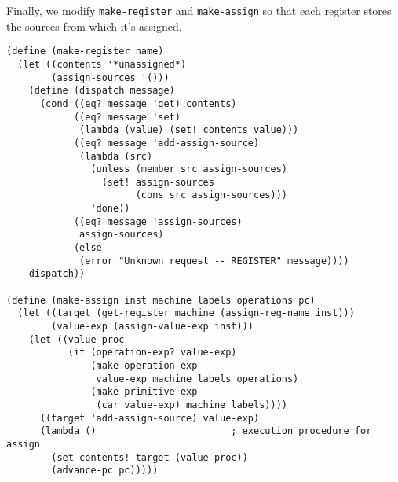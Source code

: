 \documentclass[a4paper,12pt]{article}
\begin{document}
Finally, we modify \lstinline!make-register! and
\lstinline!make-assign! so that each register stores the sources from
which it's assigned.

\begin{lstlisting}
(define (make-register name)
  (let ((contents '*unassigned*)
        (assign-sources '()))
    (define (dispatch message)
      (cond ((eq? message 'get) contents)
            ((eq? message 'set)
             (lambda (value) (set! contents value)))
            ((eq? message 'add-assign-source)
             (lambda (src)
               (unless (member src assign-sources)
                 (set! assign-sources
                       (cons src assign-sources)))
               'done))
            ((eq? message 'assign-sources)
             assign-sources)
            (else
             (error "Unknown request -- REGISTER" message))))
    dispatch))

(define (make-assign inst machine labels operations pc)
  (let ((target (get-register machine (assign-reg-name inst)))
        (value-exp (assign-value-exp inst)))
    (let ((value-proc
           (if (operation-exp? value-exp)
               (make-operation-exp
                value-exp machine labels operations)
               (make-primitive-exp
                (car value-exp) machine labels))))
      ((target 'add-assign-source) value-exp)
      (lambda ()                        ; execution procedure for assign
        (set-contents! target (value-proc))
        (advance-pc pc)))))
\end{lstlisting}
\end{document}
